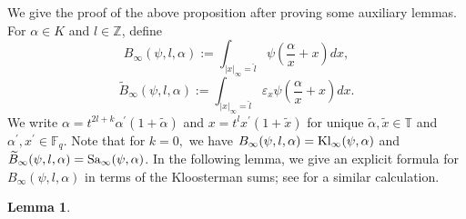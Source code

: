 \documentclass[11pt]{amsart}
\theoremstyle{plain}
\theoremstyle{plain}
\newtheorem{lemma}[theorem]{Lemma}
\theoremstyle{remark}
\theoremstyle{definition}
\newcommand{\hl}{\widehat l}
\newcommand{\Kl}{\textup{Kl}}
\newcommand{\Sa}{\textup{Sa}}
\newcommand{\FF}{\mathbb{F}}
\newcommand{\TT}{\mathbb{T}}
\begin{document}
We give the proof of the above proposition after proving some auxiliary lemmas. For $\alpha\in K$ and $l\in \mathbb{Z}$,  define
\[
B_{\infty}(\psi,l,\alpha):=\int_{|x|_{\infty}=\hl} \psi(\frac{\alpha}{ x}+x) dx,
\]
\[
\widetilde{B}_{\infty}(\psi,l,\alpha):=\int_{|x|_{\infty}=\hl} \varepsilon_{x} \psi(\frac{\alpha}{ x}+x) dx.
\]
   We write  $\alpha= t^{2l+k}\alpha^{\prime} (1+\tilde{\alpha})$ and  $x=t^lx^{\prime}(1+\tilde{x})$ for unique $\tilde{\alpha},\tilde{x}\in \TT $ and $\alpha^{\prime}, x^{\prime} \in \FF_q.$  Note that for $k=0,$ we have   $B_{\infty}(\psi,l,\alpha)=\Kl_{\infty}(\psi,\alpha)$ and $\widetilde{B}_{\infty}(\psi,l,\alpha)=\Sa_{\infty}(\psi,\alpha)$.
In the following lemma, we give an explicit formula for  $B_{\infty}(\psi,l,\alpha)$ in terms of the Kloosterman sums; see  \cite[Lemma 3.4]{Cogdell} for a similar calculation.  
\begin{lemma}\label{Bessel}













\end{lemma}
\end{document}
